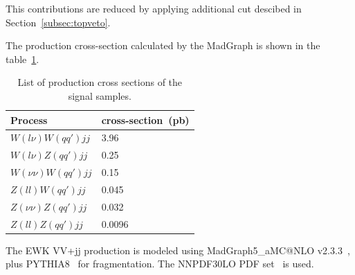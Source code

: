 This contributions are reduced by applying additional cut descibed in Section~\ref{subsec:topveto}.

The production cross-section calculated by the MadGraph is shown in the table~\ref{tab:VBS_sig_samples}.
\begin{table}[!htbp]
\begin{center}
\small
\begin{tabular}{|l|l|}
\hline
Process & cross-section~(pb) \\
\hline
$W(l\nu)W(qq\prime)jj$   &  3.96   \\
$W(l\nu)Z(qq\prime)jj$            &  0.25   \\
$W(\nu\nu)W(qq\prime)jj$          &  0.15   \\
$Z(ll)W(qq\prime)jj$              &  0.045  \\
$Z(\nu\nu)Z(qq\prime)jj$          &  0.032  \\
$Z(ll)Z(qq\prime)jj$              &  0.0096 \\
\hline
\end{tabular}
\caption{List of production cross sections of the signal samples.
}
\label{tab:VBS_sig_samples}
\end{center}
\end{table}

The EWK VV+jj production is modeled using MadGraph5\_aMC@NLO v2.3.3~\cite{Alwall:2014hca},
plus PYTHIA8~\cite{Sjostrand:2007gs} for fragmentation.
The \textsc{NNPDF30LO} PDF set~\cite{Ball:2012cx} is used.



